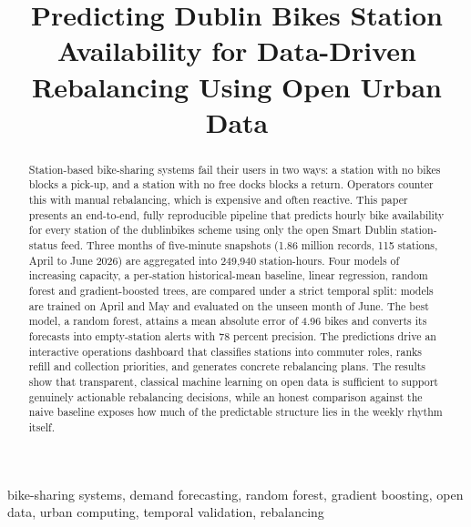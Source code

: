 \documentclass[conference]{IEEEtran}
\begin{document}
\title{Predicting Dublin Bikes Station Availability for Data-Driven Rebalancing Using Open Urban Data}

\author{
}

\maketitle

\begin{abstract}
Station-based bike-sharing systems fail their users in two ways: a station with no bikes blocks a pick-up, and a station with no free docks blocks a return. Operators counter this with manual rebalancing, which is expensive and often reactive. This paper presents an end-to-end, fully reproducible pipeline that predicts hourly bike availability for every station of the dublinbikes scheme using only the open Smart Dublin station-status feed. Three months of five-minute snapshots (1.86 million records, 115 stations, April to June 2026) are aggregated into 249,940 station-hours. Four models of increasing capacity, a per-station historical-mean baseline, linear regression, random forest and gradient-boosted trees, are compared under a strict temporal split: models are trained on April and May and evaluated on the unseen month of June. The best model, a random forest, attains a mean absolute error of 4.96 bikes and converts its forecasts into empty-station alerts with 78 percent precision. The predictions drive an interactive operations dashboard that classifies stations into commuter roles, ranks refill and collection priorities, and generates concrete rebalancing plans. The results show that transparent, classical machine learning on open data is sufficient to support genuinely actionable rebalancing decisions, while an honest comparison against the naive baseline exposes how much of the predictable structure lies in the weekly rhythm itself.
\end{abstract}

\begin{IEEEkeywords}
bike-sharing systems, demand forecasting, random forest, gradient boosting, open data, urban computing, temporal validation, rebalancing
\end{IEEEkeywords}
\end{document}
